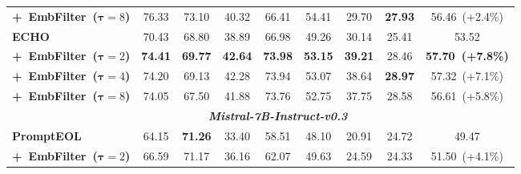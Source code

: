 \documentclass[sigconf]{acmart}
\begin{document}
\begin{table}[t]
{\begin{tabular}{lcccccccc}
            \quad \textbf{\textrm{+~EmbFilter~(\(\mathbf{\tau}=8\))}} & \cellcolor{MediumTurquoise!15} 76.33 & 73.10 & \cellcolor{MediumTurquoise!15} 40.32 & \cellcolor{MediumTurquoise!15} 66.41 & \cellcolor{MediumTurquoise!15} 54.41 & \cellcolor{MediumTurquoise!15} 29.70 & \cellcolor{MediumTurquoise!15} \textbf{27.93} & \cellcolor{MediumTurquoise!15} 56.46~(+2.4\%) \\
            \cmidrule(l{4pt}r{4pt}){1-9}
            \textbf{\textrm{ECHO}} & 70.43 & 68.80 & 38.89 & 66.98 & 49.26 & 30.14 & 25.41 & 53.52 \\
            \cmidrule(l{1pt}r{1pt}){1-9}
            \quad \textbf{\textrm{+~EmbFilter~(\(\mathbf{\tau}=2\))}} & \cellcolor{MediumTurquoise!15} \textbf{74.41} & \cellcolor{MediumTurquoise!15} \textbf{69.77} & \cellcolor{MediumTurquoise!15} \textbf{42.64} & \cellcolor{MediumTurquoise!15} \textbf{73.98} & \cellcolor{MediumTurquoise!15} \textbf{53.15} & \cellcolor{MediumTurquoise!15} \textbf{39.21} & \cellcolor{MediumTurquoise!15} 28.46 & \cellcolor{MediumTurquoise!15} \textbf{57.70~(+7.8\%)} \\
            \quad \textbf{\textrm{+~EmbFilter~(\(\mathbf{\tau}=4\))}}  & \cellcolor{MediumTurquoise!15} 74.20 & \cellcolor{MediumTurquoise!15} 69.13 & \cellcolor{MediumTurquoise!15} 42.28 & \cellcolor{MediumTurquoise!15} 73.94 & \cellcolor{MediumTurquoise!15} 53.07 & \cellcolor{MediumTurquoise!15} 38.64 & \cellcolor{MediumTurquoise!15} \textbf{28.97} & \cellcolor{MediumTurquoise!15} 57.32~(+7.1\%) \\
            \quad \textbf{\textrm{+~EmbFilter~(\(\mathbf{\tau}=8\))}} & \cellcolor{MediumTurquoise!15} 74.05 & 67.50 & \cellcolor{MediumTurquoise!15} 41.88 & \cellcolor{MediumTurquoise!15} 73.76 & \cellcolor{MediumTurquoise!15} 52.75 & \cellcolor{MediumTurquoise!15} 37.75 & \cellcolor{MediumTurquoise!15} 28.58 & \cellcolor{MediumTurquoise!15} 56.61~(+5.8\%) \\
            \midrule
            \multicolumn{1}{c}{} & \multicolumn{7}{c}{\textbf{\textit{\textrm{Mistral-7B-Instruct-v0.3}}}} \\
            \midrule
            \textbf{\textrm{PromptEOL}} & 64.15 & \textbf{71.26} & 33.40 & 58.51 & 48.10 & 20.91 & 24.72 & 49.47   \\
            \cmidrule(l{1pt}r{1pt}){1-9}
            \quad \textbf{\textrm{+~EmbFilter~(\(\mathbf{\tau}=2\))}} & \cellcolor{DodgerBlue!15} 66.59 & 71.17 & \cellcolor{DodgerBlue!15} 36.16 & \cellcolor{DodgerBlue!15} 62.07 & \cellcolor{DodgerBlue!15} 49.63 & \cellcolor{DodgerBlue!15} 24.59 & 24.33 & \cellcolor{DodgerBlue!15} 51.50~(+4.1\%) \\

\end{tabular}}
\end{table}
\end{document}
